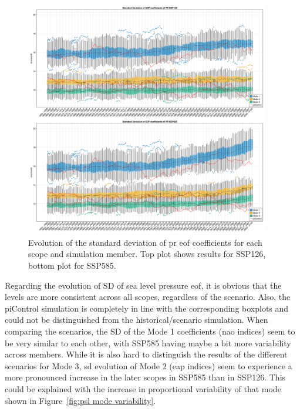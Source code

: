 \begin{figure}[htb]
  \begin{center}
    \includegraphics[width=0.95\textwidth]{figures/std_pr_50seasons_tempmodescale_3modes.png}
  \end{center}
  \caption[PR SD Evolution]{Evolution of the standard deviation of \ac{pr} \ac{eof} coefficients for each scope and simulation member. Top plot shows results for SSP126, bottom plot for SSP585.}
  \label{fig:std pr evolution}
\end{figure}

Regarding the evolution of SD of sea level pressure \ac{eof}, it is obvious that the levels are more consistent across all scopes, regardless of the scenario. 
Also, the piControl simulation is completely in line with the corresponding boxplots and could not be distinguished from the historical/scenario simulation. 
When comparing the scenarios, the SD of the Mode 1 coefficients (\ac{nao} indices) seem to be very similar to each other, with SSP585 having maybe a bit more variability across members. 
While it is also hard to distinguish the results of the different scenarios for Mode 3, \ac{sd} evolution of Mode 2 (\ac{eap} indices) seem to experience a more pronounced increase in the later scopes in SSP585 than in SSP126.  
This could be explained with the increase in proportional variability of that mode shown in Figure~\ref{fig:psl mode variability}.


